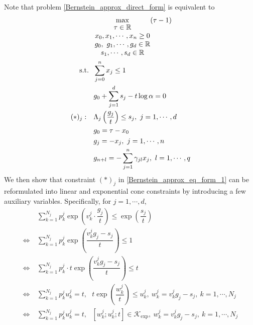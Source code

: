 \documentclass[10pt]{article}
\theoremstyle{definition}
\theoremstyle{plain}
\begin{document}
Note that problem \eqref{Bernstein_approx_direct_form} is equivalent to
\begin{align}\label{Bernstein_approx_eq_form_1}
\begin{split}
&\max_{\begin{matrix}
	\tau \in \mathbb{R} \\ 
	x_0, x_1, \cdots, x_n \geq 0\\
	g_0,\ g_1, \cdots, g_d \in \mathbb{R}\\
	s_1, \cdots, s_d \in \mathbb{R}
	\end{matrix}} (\tau - 1)\\ \textnormal{s.t.}\ \ & \sum_{j=0}^n x_j \leq 1\\
&g_0 + \sum_{j=1}^d s_j - t\log \alpha = 0 \\
{(*)_j}:\ \ \ & \Lambda_j\left(\dfrac{g_j}{t}\right) \leq s_j,\ j=1, \cdots, d\ \ \ \\
& g_0 = \tau - x_0 \\
& g_j = -x_j,\ j = 1, \cdots, n \\
& g_{n+l} = -\sum_{j=1}^n \gamma_{jl}x_j,\ l=1,\cdots, q
\end{split}
\end{align}
We then show that constraint $(*)_j$ in \eqref{Bernstein_approx_eq_form_1} can be reformulated into linear and exponential cone constraints by introducing a few auxiliary variables. Specifically, for $j=1,\cdots,d$,
\begin{align*}
&\sum_{k=1}^{N_j} p_k^j \exp \left(v_k^j \cdot \dfrac{g_j}{t}\right) \leq \exp\left(\dfrac{s_j}{t}\right) \\
\Leftrightarrow\ & \sum_{k=1}^{N_j} p_k^j \exp\left(\dfrac{v_k^j g_j - s_j}{t}\right) \leq 1 \\
\Leftrightarrow\ & \sum_{k=1}^{N_j} p_k^j\cdot  t \exp\left(\dfrac{v_k^j g_j - s_j}{t}\right) \leq t \\
\Leftrightarrow\ & \sum_{k=1}^{N_j} p_k^ju_k^j = t,\ \ \ t\exp\left(\dfrac{w_k^j}{t}\right) \leq u_k^j,\ w_k^j =v_k^j g_j - s_j,\ k = 1, \cdots, N_j \\
\Leftrightarrow\ & \sum_{k=1}^{N_j} p_k^ju_k^j = t,\ \ \ \left[w_k^j; u_k^j; t\right] \in \mathcal{K}_{\exp},\ w_k^j =v_k^j g_j - s_j,\ k = 1, \cdots, N_j
\end{align*}
\end{document}
